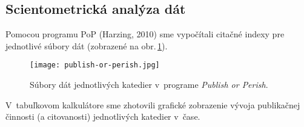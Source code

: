 \subsection{Scientometrická analýza dát}

Pomocou programu PoP (Harzing, 2010) sme vypočítali citačné indexy pre
jednotlivé súbory dát (zobrazené na obr.\,\ref{fig:pop.departmentfiles}).

\begin{figure}
  \centering
  \texttt{[image: publish-or-perish.jpg]}
  \caption{Súbory dát jednotlivých katedier v~programe \emph{Publish or
      Perish}.}
  \label{fig:pop.departmentfiles}
\end{figure}

V~tabuľkovom kalkulátore sme zhotovili grafické zobrazenie vývoja publikačnej
činnosti (a citovanosti) jednotlivých katedier v~čase.

